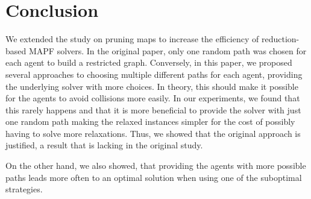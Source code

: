 \section{Conclusion}

We extended the study on pruning maps to increase the efficiency of reduction-based MAPF solvers. In the original paper, only one random path was chosen for each agent to build a restricted graph. Conversely, in this paper, we proposed several approaches to choosing multiple different paths for each agent, providing the underlying solver with more choices. In theory, this should make it possible for the agents to avoid collisions more easily. In our experiments, we found that this rarely happens and that it is more beneficial to provide the solver with just one random path making the relaxed instances simpler for the cost of possibly having to solve more relaxations. Thus, we showed that the original approach is justified, a result that is lacking in the original study.

On the other hand, we also showed, that providing the agents with more possible paths leads more often to an optimal solution when using one of the suboptimal strategies.